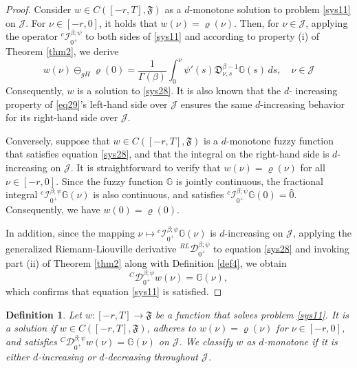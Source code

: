 \documentclass[10pt,a4paper]{amsart}
\numberwithin{equation}{section}
\newtheorem{definition}[theo]{Definition}
\begin{document}
\begin{proof}
Consider \( w \in C([- r, T], \mathfrak{F})\) as a \(d\)-monotone solution to 
problem \eqref{sys11} on \(\mathcal{J}\). For \(\nu \in [- r, 0]\), it holds that 
\( w(\nu ) = \varrho(\nu )\). Then, for \(\nu \in \mathcal{J}\), applying the operator 
\({}^c \mathcal{I}_{0^{+}}^{\beta ; \psi}\) to both sides of \eqref{sys11} and 
according to property (i) of Theorem \ref{thm2}, we derive
\begin{equation}\label{eq29}
 w(\nu ) \ominus_{g H} \varrho(0)=\frac{1}{\Gamma(\beta)}
  \int_0^{\nu } \psi'(s)\mathfrak{D}_{\nu ,s}^{\beta-1} \mathbb{G}(s)\,ds,
  \quad \nu \in\mathcal{J} 
\end{equation}
Consequently, \( w\) is a solution to \eqref{sys28}. It is also known that the \(d\)-
increasing property of \eqref{eq29}'s left-hand side over \(\mathcal{J}\) ensures the 
same \(d\)-increasing behavior for its right-hand side over \(\mathcal{J}\).

Conversely, suppose that \( w \in C([- r, T], \mathfrak{F})\) is a \(d\)-monotone 
fuzzy function that satisfies equation \eqref{sys28}, and that the integral on the 
right-hand side is \(d\)-increasing on \(\mathcal{J}\). It is straightforward to verify 
that \( w(\nu ) = \varrho(\nu )\) for all \(\nu \in [- r, 0]\). 
Since the fuzzy function \(\mathbb{G}\) is jointly continuous, the fractional integral 
\({}^c \mathcal{I}_{0^{+}}^{\beta ; \psi} \mathbb{G}(\nu )\) is also continuous, 
and satisfies \({}^c \mathcal{I}_{0^{+}}^{\beta ; \psi} \mathbb{G}(0) = \hat{0}\). 
Consequently, we have \( w(0) = \varrho(0)\).

In addition, since the mapping 
\(\nu \mapsto {}^c \mathcal{I}_{0^{+}}^{\beta ; \psi} \mathbb{G}(\nu )\) is 
\(d\)-increasing on \(\mathcal{J}\), applying the generalized Riemann-Liouville 
derivative \({}^{RL} \mathcal{D}_{0^{+}}^{\beta ; \psi}\) to equation \eqref{sys28} 
and invoking part (ii) of Theorem \ref{thm2} along with Definition \ref{def4}, 
we obtain
\[
{}^C \mathcal{D}_{0^{+}}^{\beta ; \psi} w(\nu ) = \mathbb{G}(\nu ),
\]
which confirms that equation \eqref{sys11} is satisfied.
\end{proof}

\begin{definition} \label{def5} \rm
Let \( w : [- r, T] \to \mathfrak{F}\) be a function that solves problem \eqref{sys11}. 
It is a solution if \( w \in C([- r, T], \mathfrak{F})\), adheres to 
\( w(\nu ) = \varrho(\nu )\) for \(\nu \in [- r, 0]\), and satisfies 
\({}^C \mathcal{D}_{0^{+}}^{\beta ; \psi} w(\nu ) = \mathbb{G}(\nu )\) on 
\(\mathcal{J}\). We classify \( w\) as \(d\)-monotone if it is either \(d\)-increasing
or \(d\)-decreasing throughout \(\mathcal{J}\).
\end{definition}
\end{document}
